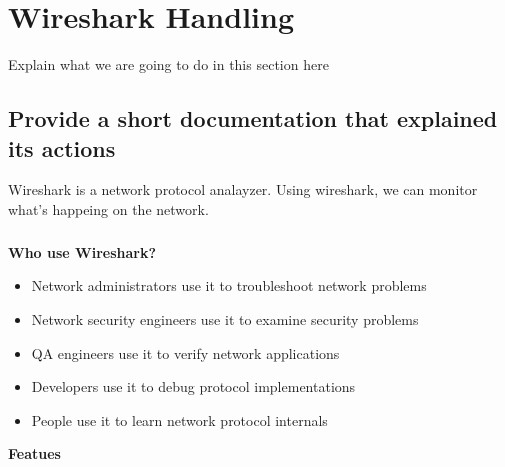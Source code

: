 \label{Wireshark Handling}
\chapter{Wireshark Handling}
Explain what we are going to do in this section here

\section{Provide a short documentation that explained its actions}

Wireshark is a network protocol analayzer. Using wireshark, we can monitor what's happeing on the network.
\paragraph{}
\textbf{Who use Wireshark?}
\begin{itemize}
\item Network administrators use it to troubleshoot network problems
\end{itemize}
\begin{itemize}
\item Network security engineers use it to examine security problems
\item QA engineers use it to verify network applications
\item Developers use it to debug protocol implementations
\item People use it to learn network protocol internals 
\end{itemize}

\textbf{Featues}

